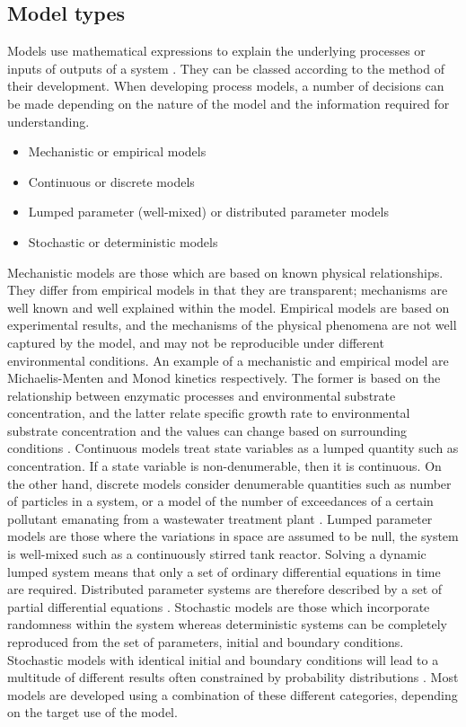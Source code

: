 \subsection{Model types}
\label{ssec:chap1-wwtmod}
Models use mathematical expressions to explain the underlying processes or inputs of outputs of a system \cite{hangos2001}. They can be classed according to the method of their development. When developing process models, a number of decisions can be made depending on the nature of the model and the information required for understanding.
\begin{itemize}
    \item Mechanistic or empirical models
    \item Continuous or discrete models
    \item Lumped parameter (well-mixed) or distributed parameter models
    \item Stochastic or deterministic models
\end{itemize}

Mechanistic models are those which are based on known physical relationships. They differ from empirical models in that they are transparent; mechanisms are well known and well explained within the model. Empirical models are based on experimental results, and the mechanisms of the physical phenomena are not well captured by the model, and may not be reproducible under different environmental conditions. An example of a mechanistic and empirical model are Michaelis-Menten and Monod kinetics respectively. The former is based on the relationship between enzymatic processes and environmental substrate concentration, and the latter relate specific growth rate to environmental substrate concentration and the values can change based on surrounding conditions \cite{tchobanoglous1991}. Continuous models treat state variables as a lumped quantity such as concentration. If a state variable is non-denumerable, then it is continuous. On the other hand, discrete models consider denumerable quantities such as number of particles in a system, or a model of the number of exceedances of a certain pollutant emanating from a wastewater treatment plant \cite{hangos2001}. Lumped parameter models are those where the variations in space are assumed to be null, \ie the system is well-mixed such as a continuously stirred tank reactor. Solving a dynamic lumped system means that only a set of ordinary differential equations in time are required. Distributed parameter systems are therefore described by a set of partial differential equations \cite{hangos2001}. Stochastic models are those which incorporate randomness within the system whereas deterministic systems can be completely reproduced from the set of parameters, initial and boundary conditions. Stochastic models with identical initial and boundary conditions will lead to a multitude of different results often constrained by probability distributions \cite{voskoglou2007}. Most models are developed using a combination of these different categories, depending on the target use of the model.


